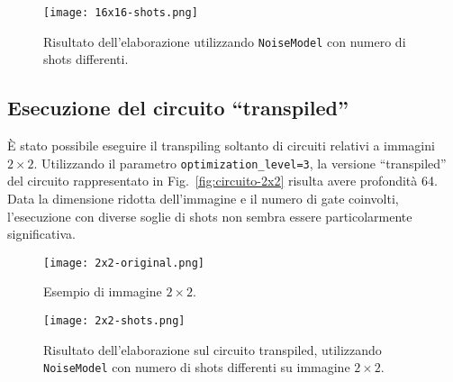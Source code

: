\begin{figure}[ht]
	\centering
	\texttt{[image: 16x16-shots.png]}
	\caption{Risultato dell'elaborazione utilizzando \texttt{NoiseModel} con numero di shots differenti.}\label{fig:16x16-shots}
\end{figure}

\subsection{Esecuzione del circuito ``transpiled''}
È stato possibile eseguire il transpiling soltanto di circuiti relativi a
immagini $2 \times 2$. Utilizzando il
parametro \texttt{optimization\_level=3}, la versione ``transpiled'' del circuito
rappresentato in Fig.~\ref{fig:circuito-2x2} risulta avere profondità 64. Data
la dimensione ridotta dell'immagine e il numero di gate coinvolti, l'esecuzione
con diverse soglie di shots non sembra essere particolarmente significativa.

\begin{figure}[ht]
	\begin{center}
		\texttt{[image: 2x2-original.png]}
	\end{center}
	\caption{Esempio di immagine $2\times2$.}\label{fig:2x2-original}
\end{figure}

\begin{figure}[ht]
	\begin{center}
		\texttt{[image: 2x2-shots.png]}
	\end{center}
	\caption{Risultato dell'elaborazione sul circuito transpiled, 
	utilizzando \texttt{NoiseModel} con numero di shots differenti 
	su immagine $2\times2$.}\label{fig:2x2-shots}
\end{figure}

